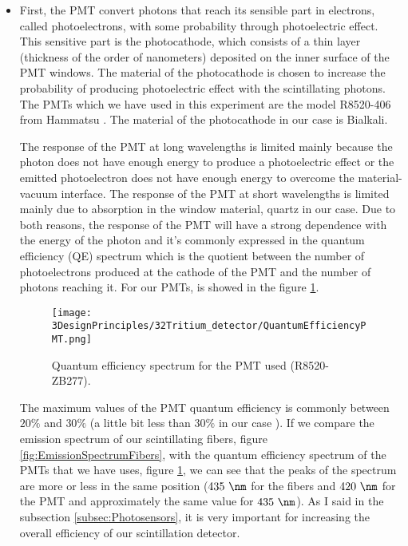 \begin{itemize}
\item{} First, the PMT convert photons that reach its sensible part in electrons, called photoelectrons, with some probability through photoelectric effect. This sensitive part is the photocathode, which consists of a thin layer (thickness of the order of nanometers) deposited on the inner surface of the PMT windows. The material of the photocathode is chosen to increase the probability of producing photoelectric effect with the scintillating photons. The PMTs which we have used in this experiment are the model R8520-406 from Hammatsu \cite{DataSheetPMTs}. The material of the photocathode in our case is Bialkali.

The response of the PMT at long wavelengths is limited mainly because the photon does not have enough energy to produce a photoelectric effect or the emitted photoelectron does not have enough energy to overcome the material-vacuum interface. The response of the PMT at short wavelengths is limited mainly due to absorption in the window material, quartz in our case. Due to both reasons, the response of the PMT will have a strong dependence with the energy of the photon and it's commonly expressed in the quantum efficiency (QE) spectrum which is the quotient between the number of photoelectrons produced at the cathode of the PMT and the number of photons reaching it. For our PMTs, is showed in the figure \ref{fig:QuantumEfficiencyPMT}.

\begin{figure}[htbp]
\centering
\texttt{[image: 3DesignPrinciples/32Tritium\_detector/QuantumEfficiencyPMT.png]}
\caption{Quantum efficiency spectrum for the PMT used (R8520-ZB277).\label{fig:QuantumEfficiencyPMT}~\cite{DataSheetPMTs}}
\end{figure}

The maximum values of the PMT quantum efficiency is commonly between $20\%$ and $30\%$ \cite{Knoll} (a little bit less than $30\%$ in our case \cite{DataSheetPMTs}). If we compare the emission spectrum of our scintillating fibers, figure \ref{fig:EmissionSpectrumFibers}, with the quantum efficiency spectrum of the PMTs that we have uses, figure \ref{fig:QuantumEfficiencyPMT}, we can see that the peaks of the spectrum are more or less in the same position ($435~\nm$ for the fibers and $420~\nm$ for the PMT and approximately the same value for $435~\nm$). As I said in the subsection \ref{subsec:Photosensors}, it is very important for increasing the overall efficiency of our scintillation detector. 


\end{itemize}
